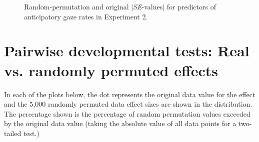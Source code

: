 \documentclass[authoryear, 12pt]{elsarticle}
\begin{document}
\begin{figure}[!htb]
  \centering
  \hfill
  \caption{Random-permutation and original $|$\textit{SE}-values$|$ for predictors of anticipatory gaze rates in Experiment 2.}
\end{figure}

\section{Pairwise developmental tests: Real vs. randomly permuted effects}
\setcounter{figure}{0}  

In each of the plots below, the dot represents the original data value for the effect and the 5,000 randomly permuted data effect sizes are shown in the distribution. The percentage shown is the percentage of random permutation values exceeded by the original data value (taking the absolute value of all data points for a two-tailed test.)
\end{document}

